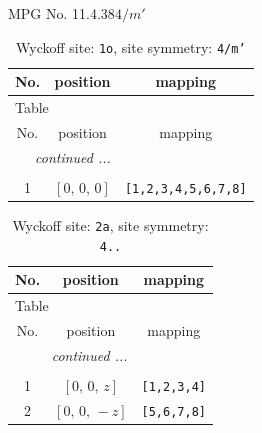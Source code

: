 \documentclass[fleqn,8pt]{jsarticle}
\begin{document}
\setcounter{MaxMatrixCols}{32}

\renewcommand{\tablename}{Table~}
\renewcommand{\figurename}{Figure~}
\begin{center}
\LARGE
MPG No. 11.4.38\quad$4/m'$
\end{center}
\renewcommand{\arraystretch}{1.2}
\begin{longtable}{ccc}
\caption{Wyckoff site: {\tt 1o}, site symmetry: {\tt 4/m'}}
 \\
 \hline \hline
No. & position & mapping \\ \hline \endfirsthead

\multicolumn{2}{l}{\tablename\ \thetable{}} \\
 \hline \hline
No. & position & mapping \\ \hline \endhead

 \hline \hline
\multicolumn{2}{r}{\footnotesize\it continued ...} \\ \endfoot

 \hline \hline
\multicolumn{2}{r}{} \\ \endlastfoot

1 & $\left[ 0,\, 0,\, 0 \right]$ & {\tt [1,2,3,4,5,6,7,8]} \\
\end{longtable}
\renewcommand{\arraystretch}{1.2}
\begin{longtable}{ccc}
\caption{Wyckoff site: {\tt 2a}, site symmetry: {\tt 4..}}
 \\
 \hline \hline
No. & position & mapping \\ \hline \endfirsthead

\multicolumn{2}{l}{\tablename\ \thetable{}} \\
 \hline \hline
No. & position & mapping \\ \hline \endhead

 \hline \hline
\multicolumn{2}{r}{\footnotesize\it continued ...} \\ \endfoot

 \hline \hline
\multicolumn{2}{r}{} \\ \endlastfoot

1 & $\left[ 0,\, 0,\, z \right]$ & {\tt [1,2,3,4]} \\ \hline
2 & $\left[ 0,\, 0,\, - z \right]$ & {\tt [5,6,7,8]} \\
\end{longtable}
\renewcommand{\arraystretch}{1.2}
\end{document}
